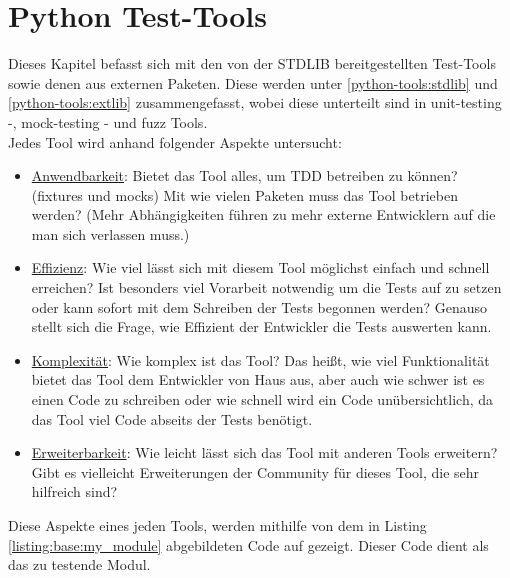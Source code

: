 \section{Python Test-Tools}\label{python-tools}

Dieses Kapitel befasst sich mit den von der STDLIB bereitgestellten Test-Tools
sowie denen aus externen Paketen.
Diese werden unter \ref{python-tools:stdlib} und \ref{python-tools:extlib}
zusammengefasst, wobei diese unterteilt sind in unit-testing -,
\gls{mock}-testing - und \gls{fuzz} Tools.
\newline
\\
Jedes Tool wird anhand folgender Aspekte untersucht:
\begin{itemize}
    \item \underline{Anwendbarkeit}:\newline
    Bietet das Tool alles, um TDD betreiben zu können? (\Glspl{fixture} und \Glspl{mock})
    Mit wie vielen Paketen muss das Tool betrieben werden? (Mehr Abhängigkeiten führen zu
    mehr externe Entwicklern auf die man sich verlassen muss.)
    
    \item \underline{Effizienz}:\newline
    Wie viel lässt sich mit diesem Tool möglichst einfach und
    schnell erreichen? Ist besonders viel Vorarbeit notwendig um die Tests
    auf zu setzen oder kann sofort mit dem Schreiben der Tests begonnen
    werden?
    \newline
    Genauso stellt sich die Frage, wie Effizient der Entwickler die Tests
    auswerten kann.
    
    \item \underline{Komplexität}:\newline
    Wie komplex ist das Tool? Das heißt, wie viel Funktionalität
    bietet das Tool dem Entwickler von Haus aus, aber auch wie schwer
    ist es einen Code zu schreiben oder wie schnell wird ein Code unübersichtlich, da
    das Tool viel Code abseits der Tests benötigt.
    
    \item \underline{Erweiterbarkeit}:\newline
    Wie leicht lässt sich das Tool mit anderen Tools erweitern?
    Gibt es vielleicht Erweiterungen der Community für dieses Tool, die sehr
    hilfreich sind?
\end{itemize}

Diese Aspekte eines jeden Tools, werden mithilfe von dem in Listing \ref{listing:base:my_module}
abgebildeten Code auf gezeigt. Dieser Code dient als das zu testende Modul.

